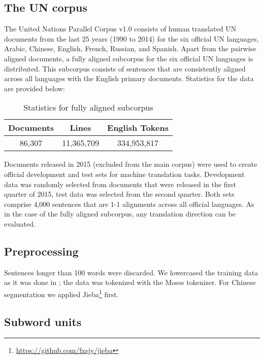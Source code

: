 \documentclass[11pt]{article}
\begin{document}
\subsection{The UN corpus}

The United Nations Parallel Corpus v1.0 \cite{ZIEMSKI16.1195} consists of human translated UN documents from the last 25 years (1990 to 2014) for the six official UN languages, Arabic, Chinese, English, French, Russian, and Spanish. Apart from the pairwise aligned documents, a fully aligned subcorpus for the six official UN languages is distributed. This subcorpus consists of sentences that are consistently aligned across all languages with the English primary documents. Statistics for the data are provided below:

\begin{table}[h]
\centering \setlength{\arrayrulewidth}{1pt}
\begin{tabular}{ccc}
\toprule
Documents & Lines & English Tokens \\ \midrule
86,307 & 11,365,709 & 334,953,817 \\ \bottomrule
\end{tabular} 
\caption{Statistics for fully aligned subcorpus}
\label{tab.statistics.fully}
\end{table}

Documents released in 2015 (excluded from the main corpus) were used to create official development and test sets for machine translation tasks. Development data was randomly selected from documents that were released in the first quarter of 2015, test data was selected from the second quarter. 
Both sets comprise 4,000 sentences that are 1-1 alignments across all official languages. As in the case of the fully aligned subcorpus, any translation direction can be evaluated.

\subsection{Preprocessing}

Sentences longer than 100 words were discarded. We lowercased the training data as it was done in \cite{ZIEMSKI16.1195}; the data was tokenized with the Moses tokenizer. For Chinese segmentation we applied Jieba\footnote{\url{https://github.com/fxsjy/jieba}} first. 

\subsection{Subword units}
\end{document}
